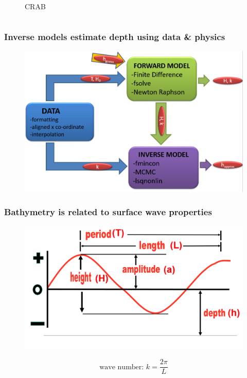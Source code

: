 \documentclass[7pt]{beamer}
\begin{document}
\begin{frame}
\begin{columns}
\begin{figure}[h]
                \captionsetup{labelformat=empty}
                \caption{CRAB}
            \end{figure}  
    \end{columns}
\end{frame}

\begin{frame}
    \frametitle{Inverse models estimate depth using data \& physics}
    
    	\begin{figure}[H]
	 	\centering
	 	\includegraphics[width=1.0\linewidth]{img/Flow_C.png}
	\end{figure}
\end{frame}

\begin{frame}
    \frametitle{Bathymetry is related to surface wave properties}
        \begin{figure}[flowchart]
            \includegraphics[width=1.0\linewidth]{img/Wave.jpg}
        \end{figure}
        \centering
        \begin{equation*}
        		\textrm{wave number: } k = \frac{2\pi}{L}
        \end{equation*}
\end{frame}
\end{document}
